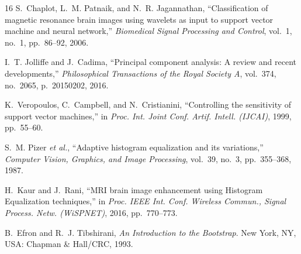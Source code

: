 \documentclass[conference]{IEEEtran}
\begin{document}
\begin{thebibliography}{16}
S.~Chaplot, L.~M. Patnaik, and N.~R. Jagannathan, ``Classification of magnetic resonance brain images using wavelets as input to support vector machine and neural network,'' \emph{Biomedical Signal Processing and Control}, vol.~1, no.~1, pp.~86--92, 2006.

I.~T. Jolliffe and J.~Cadima, ``Principal component analysis: A review and recent developments,'' \emph{Philosophical Transactions of the Royal Society A}, vol.~374, no.~2065, p.~20150202, 2016.

K.~Veropoulos, C.~Campbell, and N.~Cristianini, ``Controlling the sensitivity of support vector machines,'' in \emph{Proc. Int. Joint Conf. Artif. Intell. (IJCAI)}, 1999, pp.~55--60.

S.~M. Pizer \emph{et al.}, ``Adaptive histogram equalization and its variations,'' \emph{Computer Vision, Graphics, and Image Processing}, vol.~39, no.~3, pp.~355--368, 1987.

H.~Kaur and J.~Rani, ``MRI brain image enhancement using Histogram Equalization techniques,'' in \emph{Proc. IEEE Int. Conf. Wireless Commun., Signal Process. Netw. (WiSPNET)}, 2016, pp.~770--773.

B.~Efron and R.~J. Tibshirani, \emph{An Introduction to the Bootstrap}. New York, NY, USA: Chapman \& Hall/CRC, 1993.

\end{thebibliography}
\end{document}
